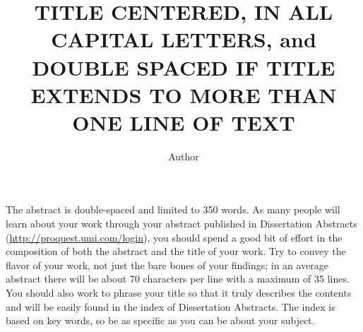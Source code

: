 \documentclass{iuphd}
\begin{document}
\title{TITLE CENTERED, IN ALL CAPITAL LETTERS, and DOUBLE SPACED IF TITLE EXTENDS TO MORE THAN ONE LINE OF TEXT}
\author{Author}
\monthGranted{\DTMmonthname{\month}}
\yearGranted{\the\year}
\maketitle

\acceptancepage%


% 


\begin{abstract*}[\bigskipamount]
 The abstract is double-spaced and limited to 350 words. As many people will learn about
your work through your abstract published in Dissertation Abstracts (\url{http://proquest.umi.com/login}),
you should spend a good bit of effort in the composition of both the abstract and the title of your work.
Try to convey the flavor of your work, not just the bare bones of your findings; in an average abstract
there will be about 70 characters per line with a maximum of 35 lines. You should also work to phrase your
title so that it truly describes the contents and will be easily found in the index of Dissertation Abstracts.
The index is based on key words, so be as specific as you can be about your subject. 
\end{abstract*}

\tableofcontents






% 
% 
\end{document}

